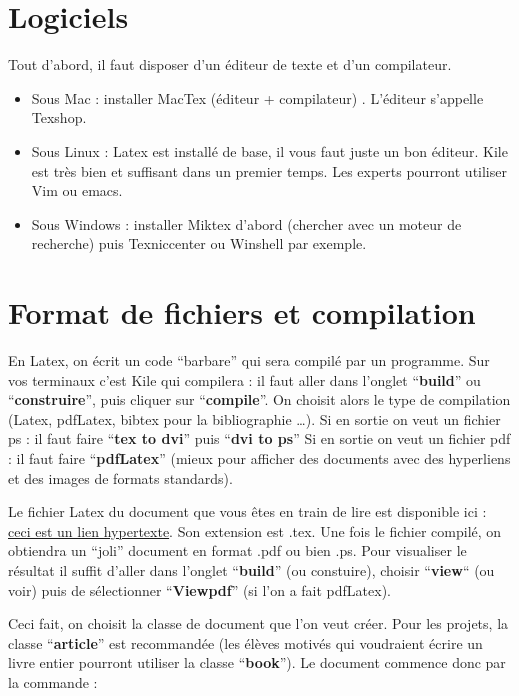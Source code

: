 \section{Logiciels}
Tout d'abord, il faut disposer d'un éditeur de texte et d'un compilateur.

\begin{itemize}
\item Sous Mac : installer MacTex  (éditeur + compilateur) . L'éditeur s'appelle Texshop.  
\item Sous Linux : Latex est installé de base, il vous faut juste un bon éditeur. Kile est très
 bien et suffisant
dans un premier temps. Les experts pourront utiliser Vim ou emacs. 
\item Sous Windows : installer Miktex d'abord (chercher avec un moteur de recherche) puis Texniccenter 
ou  Winshell par exemple.
\end{itemize}


\section{Format de fichiers et compilation}
En Latex, on écrit un code ``barbare'' qui sera compil\'e par un programme. Sur vos terminaux c'est Kile 
qui compilera : il faut aller dans l'onglet ``\textbf{build}'' ou ``\textbf{construire}'', puis cliquer 
sur ``\textbf{compile}''. On choisit alors le type de compilation (Latex, pdfLatex, bibtex pour la
 bibliographie \ldots). 
Si en sortie on veut un fichier ps : il faut faire ``\textbf{tex to dvi}'' puis  ``\textbf{dvi to ps}''
Si en sortie on veut un fichier pdf : il faut faire ``\textbf{pdfLatex}'' (mieux pour afficher des documents 
avec des hyperliens et des images de formats standards).

Le fichier Latex du document que vous êtes en train de lire est  disponible ici : 
\href{http://people.math.jussieu.fr/~salmon/enseignement/M1/introlatex.tex}{ceci est un lien hypertexte}.  
Son extension est  .tex. Une fois le fichier compilé,  on obtiendra un ``joli'' document en format .pdf 
ou bien .ps. Pour visualiser le résultat il suffit d'aller dans l'onglet  ``\textbf{build}'' 
(ou constuire), choisir ``\textbf{view}`` (ou voir) puis de sélectionner ``\textbf{Viewpdf}'' 
(si l'on a fait pdfLatex).\medskip

Ceci fait, on choisit la classe de document  que l'on veut créer.  Pour les projets,  
la classe ``\textbf{article}'' est recommandée (les élèves motivés qui voudraient écrire un 
livre entier pourront utiliser la classe ``\textbf{book}''). Le document commence donc par la 
commande :\medskip

